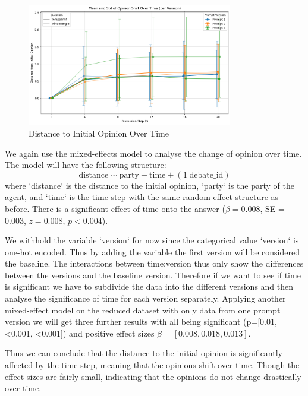 \documentclass[12pt]{article}
\begin{document}
\begin{figure}[h]
\centering
\includegraphics[width=0.8\textwidth]{img/distance_to_initial_opinion.png}
\caption{Distance to Initial Opinion Over Time}
\label{fig:distance_to_initial_opinion}
\end{figure}

We again use the mixed-effects model to analyse the change of opinion over time. The model will have the following structure:
\begin{equation}
    \text{distance} \sim \text{party} + \text{time} + (1 | \text{debate\_id})
\end{equation}
where `distance` is the distance to the initial opinion, `party` is the party of the agent, and `time` is the time step with the same random effect structure as before. There is a significant effect of time onto the answer  ($\beta = 0.008$, SE = 0.003, $z = 0.008$, $p < 0.004$).

We withhold the variable `version` for now since the categorical value `version` is one-hot encoded. Thus by adding the variable the first version will be considered the baseline. The interactions between time:version thus only show the differences between the versions and the baseline version. Therefore if we want to see if time is significant we have to subdivide the data into the different versions and then analyse the significance of time for each version separately. Applying another mixed-effect model on the reduced dataset with only data from one prompt version we will get three further results with all being significant (p=[0.01,\textless 0.001, \textless 0.001]) and positive effect sizes $\beta=[0.008,0.018,0.013]$. 

Thus we can conclude that the distance to the initial opinion is significantly affected by the time step, meaning that the opinions shift over time. Though the effect sizes are fairly small, indicating that the opinions do not change drastically over time. 
\end{document}
